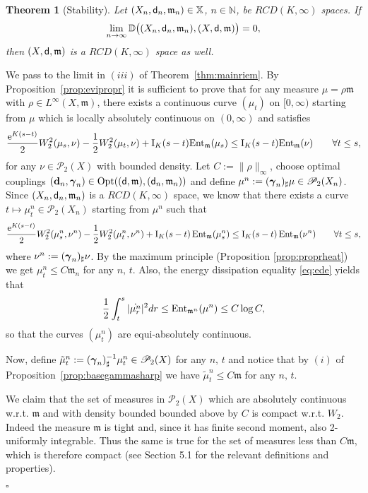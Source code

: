 \documentclass[reqno,11pt]{article}
\numberwithin{equation}{section}
\newcommand{\D}{\mathbb{D}}
\newcommand{\N}{\mathbb{N}}
\newcommand{\mm}{{\mbox{\boldmath$m$}}}
\newcommand{\ggamma}{{\mbox{\boldmath$\gamma$}}}
\newcommand{\sfd}{{\sf d}}
\newcommand{\rme}{{\mathrm e}}
\newcommand{\ProbabilitiesTwo}[1]{\mathscr P_2(#1)}     %
\newenvironment{proof}{\removelastskip\par\medskip   %
\noindent{\em Proof.}
\rm}{\penalty-20\null\hfill$\square$\par\medbreak}
\newtheorem{theorem}{Theorem}[section]
\newcommand{\probt}{\ProbabilitiesTwo}
\newcommand{\opt}[2]{{\rm{Opt}}(#1,#2)}
\newcommand{\X}{\mathbb X}
\newcommand{\entr}[2]{{\rm Ent}_{#2}(#1)}              %
\newcommand{\rcd}[2]{RCD(#1,#2)}
\renewcommand{\mm}{\mathfrak m}
\begin{document}
\begin{theorem}[Stability]
Let $(X_n,\sfd_n,\mm_n)\in\X$, $n\in\N$, be $\rcd K\infty$ spaces.
If
\[
\lim_{n\to\infty}\D\big((X_n,\sfd_n,\mm_n),(X,\sfd,\mm)\big)=0,
\]
then $(X,\sfd,\mm)$ is a $\rcd K\infty$ space as well.
\end{theorem}
\begin{proof}
We pass to the limit in  $(iii)$ of Theorem~\ref{thm:mainriem}. By
Proposition~\ref{prop:evipropr} it is sufficient to prove that for
any measure $\mu=\rho\mm$ with $\rho\in L^\infty(X,\mm)$, there
exists a continuous curve $(\mu_t)$ on $[0,\infty)$ starting from
$\mu$ which is locally absolutely continuous on $(0,\infty)$ and
satisfies
\begin{equation}
\label{eq:claimstab} \frac{\rme^{K(s-t)}}2 W_2^2(\mu_s,\nu)-\frac
12W_2^2(\mu_t,\nu)+ \mathrm I_K(s-t)\entr{\mu_s}{\mm} \leq \mathrm
I_K(s-t)\entr\nu{\mm}\qquad\forall t\leq s,
\end{equation}
for any $\nu\in\probt{X}$ with bounded density. Let
$C:=\|\rho\|_{\infty}$, choose optimal couplings $({\bf
d}_n,\ggamma_n)\in\opt{(\sfd,\mm)}{(\sfd_n,\mm_n)}$ and define
$\mu^n:=(\ggamma_n)_\sharp\mu\in\probt{X_n}$. Since
$(X_n,\sfd_n,\mm_n)$ is a $\rcd K\infty$ space, we know that there
exists a curve $t\mapsto\mu^n_t\in\probt{X_n}$ starting from $\mu^n$
such that
\begin{equation}
\label{eq:eviappr} \frac{\rme^{K(s-t)}}2 W_2^2(\mu^n_s,\nu^n)-\frac
12W_2^2(\mu^n_t,\nu^n)+ \mathrm I_K(s-t)\,\entr{\mu^n_s}{\mm} \leq
\mathrm I_K(s-t)\,\entr{\nu^n}{\mm}\qquad\forall t\leq s,
\end{equation}
where $\nu^n:=(\ggamma_n)_\sharp\nu$. By the maximum principle
(Proposition \ref{prop:proprheat}) we get $\mu^n_t\leq C\mm_n$ for
any $n,\,t$. Also, the energy dissipation equality \eqref{eq:ede}
yields that
\begin{equation}
\label{eq:equicont} \frac12\int_t^s|\dot{\mu^n_r}|^2dr\leq
\entr{\mu^n}{\mm^n}\leq C\log C,
\end{equation}
so that the curves $(\mu^n_t)$ are equi-absolutely continuous.

Now, define
$\tilde\mu^n_t:=(\ggamma_n)^{-1}_\sharp\mu^n_t\in\probt{X}$ for any
$n,\,t$ and notice that by $(i)$ of
Proposition~\ref{prop:basegammasharp} we have $\tilde\mu^n_t\leq
C\mm$ for any $n,\,t$.

We claim that the set of measures in $\probt X$ which are absolutely
continuous w.r.t. $\mm$ and with density bounded bounded above by
$C$ is compact w.r.t. $W_2$. Indeed the measure $\mm$ is tight and,
since it has finite second moment, also 2-uniformly integrable. Thus
the same is true for the set of measures less than $C\mm$, which is
therefore compact (see \cite{Ambrosio-Gigli-Savare08} Section 5.1
for the relevant definitions and properties).


\end{proof}
\end{document}
